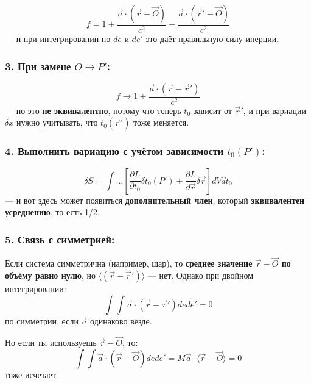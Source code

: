 \documentclass[11pt]{article}
\begin{document}
\[
f = 1 + \frac{\vec{a} \cdot (\vec{r} - \vec{O})}{c^2} - \frac{\vec{a} \cdot (\vec{r}' - \vec{O})}{c^2}
\] --- и при интегрировании по \(de\) и \(de'\) это даёт правильную силу
инерции.

\subsubsection{\texorpdfstring{3. \textbf{При замене
\(O \to P'\)}:}{3. При замене O \textbackslash{}to P':}}\label{ux43fux440ux438-ux437ux430ux43cux435ux43dux435-o-to-p}

\[
f \to 1 + \frac{\vec{a} \cdot (\vec{r} - \vec{r}')}{c^2}
\] --- но это \textbf{не эквивалентно}, потому что теперь \(t_0\)
зависит от \(\vec{r}'\), и при вариации \(\delta x\) нужно учитывать,
что \(t_0(\vec{r}')\) тоже меняется.

\subsubsection{\texorpdfstring{4. \textbf{Выполнить вариацию с учётом
зависимости
\(t_0(P')\)}:}{4. Выполнить вариацию с учётом зависимости t\_0(P'):}}\label{ux432ux44bux43fux43eux43bux43dux438ux442ux44c-ux432ux430ux440ux438ux430ux446ux438ux44e-ux441-ux443ux447ux451ux442ux43eux43c-ux437ux430ux432ux438ux441ux438ux43cux43eux441ux442ux438-t_0p}

\[
\delta S = \int \dots \left[ \frac{\partial L}{\partial t_0} \delta t_0(P') + \frac{\partial L}{\partial \vec{r}} \delta \vec{r} \right] dV dt_0
\] --- и вот здесь может появиться \textbf{дополнительный член}, который
\textbf{эквивалентен усреднению}, то есть 1/2.

\subsubsection{\texorpdfstring{5. \textbf{Связь с
симметрией}:}{5. Связь с симметрией:}}\label{ux441ux432ux44fux437ux44c-ux441-ux441ux438ux43cux43cux435ux442ux440ux438ux435ux439}

Если система симметрична (например, шар), то \textbf{среднее значение
\(\vec{r} - \vec{O}\) по объёму равно нулю}, но
\(\langle (\vec{r} - \vec{r}') \rangle\) --- нет. Однако при двойном
интегрировании: \[
\int \int \vec{a} \cdot (\vec{r} - \vec{r}') de de' = 0
\] по симметрии, если \(\vec{a}\) одинаково везде.

Но если ты используешь \(\vec{r} - \vec{O}\), то: \[
\int \int \vec{a} \cdot (\vec{r} - \vec{O}) de de' = M \vec{a} \cdot \langle \vec{r} - \vec{O} \rangle = 0
\] тоже исчезает.
\end{document}
